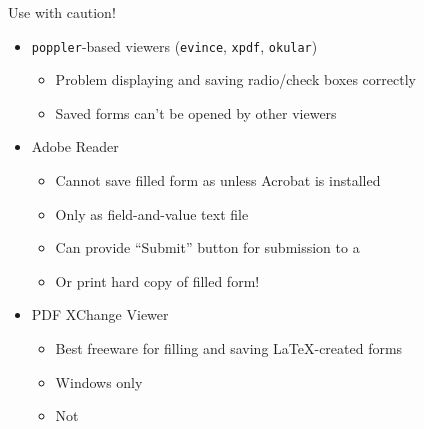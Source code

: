 \begin{frame}
\alert{Use with caution!}
\begin{itemize}
\item \texttt{poppler}-based viewers (\texttt{evince}, \texttt{xpdf}, \texttt{okular})
\begin{itemize}
\item Problem displaying and saving radio/check boxes correctly
\item Saved forms can't be opened by other viewers
\end{itemize}
\item Adobe Reader
\begin{itemize}
\item Cannot save filled form as  unless Acrobat is installed
\item Only as field-and-value text file
\item Can provide ``Submit'' button for submission to a 
\item Or print hard copy of filled form!
\end{itemize}
\item PDF XChange Viewer
\begin{itemize}
\item Best freeware for filling and saving \LaTeX-created forms
\item Windows only
\item Not 
\end{itemize}
\end{itemize}

\end{frame}


